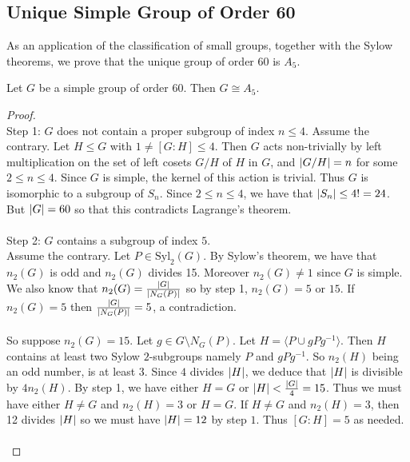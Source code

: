\documentclass[a4paper]{article}
\begin{document}
\subsection{Unique Simple Group of Order 60}
As an application of the classification of small groups, together with the Sylow theorems, we prove that the unique group of order $60$ is $A_5$. 

\begin{thm}{}{} Let $G$ be a simple group of order $60$. Then $G\cong A_5$. \tcbline
\begin{proof}~\\
Step 1: $G$ does not contain a proper subgroup of index $n\leq 4$. 
Assume the contrary. Let $H\leq G$ with $1\neq[G:H]\leq 4$. Then $G$ acts non-trivially by left multiplication on the set of left cosets $G/H$ of $H$ in $G$, and $\abs{G/H}=n$ for some $2\leq n\leq 4$. Since $G$ is simple, the kernel of this action is trivial. Thus $G$ is isomorphic to a subgroup of $S_n$. Since $2\leq n\leq 4$, we have that $\abs{S_n}\leq 4!=24$. But $\abs{G}=60$ so that this contradicts Lagrange's theorem. \\~\\

Step 2: $G$ contains a subgroup of index $5$. \\
Assume the contrary. Let $P\in\text{Syl}_2(G)$. By Sylow's theorem, we have that $n_2(G)$ is odd and $n_2(G)$ divides 15. Moreover $n_2(G)\neq 1$ since $G$ is simple. We also know that $n_2(G)=\frac{\abs{G}}{\abs{N_G(P)}}$ so by step 1, $n_2(G)=5$ or $15$. If $n_2(G)=5$ then $\frac{\abs{G}}{\abs{N_G(P)}}=5$, a contradiction. \\~\\

So suppose $n_2(G)=15$. Let $g\in G\setminus N_G(P)$. Let $H=\langle P\cup gPg^{-1}\rangle$. Then $H$ contains at least two Sylow $2$-subgroups namely $P$ and $gPg^{-1}$. So $n_2(H)$ being an odd number, is at least $3$. Since $4$ divides $\abs{H}$, we deduce that $\abs{H}$ is divisible by $4n_2(H)$. By step 1, we have either $H=G$ or $\abs{H}<\frac{\abs{G}}{4}=15$. Thus we must have either $H\neq G$ and $n_2(H)=3$ or $H=G$. If $H\neq G$ and $n_2(H)=3$, then 12 divides $\abs{H}$ so we must have $\abs{H}=12$ by step $1$. Thus $[G:H]=5$ as needed. \\~\\


\end{proof}
\end{thm}
\end{document}
